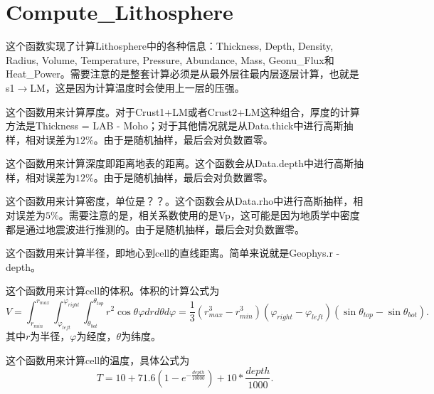 	\section{Compute\_Lithosphere}
		这个函数实现了计算Lithosphere中的各种信息：Thickness, Depth, Density, Radius, Volume, Temperature, Pressure, Abundance, Mass, Geonu\_Flux和Heat\_Power。需要注意的是整套计算必须是从最外层往最内层逐层计算，也就是s1$\rightarrow$LM，这是因为计算温度时会使用上一层的压强。
		\begin{GCBox}[title = Compute\_Layer\_Thickness]{}
			这个函数用来计算厚度。对于Crust1+LM或者Crust2+LM这种组合，厚度的计算方法是Thickness = LAB - Moho；对于其他情况就是从Data.thick中进行高斯抽样，相对误差为$12\%$。由于是随机抽样，最后会对负数置零。
		\end{GCBox}
		\begin{GCBox}[title = Compute\_Layer\_Depth]{}
			这个函数用来计算深度即距离地表的距离。这个函数会从Data.depth中进行高斯抽样，相对误差为$12\%$。由于是随机抽样，最后会对负数置零。
		\end{GCBox}
		\begin{GCBox}[title = Compute\_Layer\_Density]{}
			这个函数用来计算密度，单位是？？。这个函数会从Data.rho中进行高斯抽样，相对误差为$5\%$。需要注意的是，相关系数使用的是Vp，这可能是因为地质学中密度都是通过地震波进行推测的。由于是随机抽样，最后会对负数置零。
		\end{GCBox}
		\begin{GCBox}[title = Compute\_Layer\_Radius]{}
			这个函数用来计算半径，即地心到cell的直线距离。简单来说就是Geophys.r - depth。
		\end{GCBox}
		\begin{GCBox}[title = Compute\_Layer\_Volume]{}
			这个函数用来计算cell的体积。体积的计算公式为
				\begin{equation}
					V
					= \int_{r_{min}}^{r_{max}}\int_{\varphi_{left}}^{\varphi_{right}}\int_{\theta_{bot}}^{\theta_{top}}r^2\cos\theta\varphi drd\theta d\varphi
					= \frac{1}{3}(r_{max}^3 - r^3_{min})(\varphi_{right} - \varphi_{left})(\sin \theta_{top} - \sin\theta_{bot}).
				\end{equation}
			其中$r$为半径，$\varphi$为经度，$\theta$为纬度。
		\end{GCBox}
		\begin{GCBox}[title = Compute\_Layer\_Temperature]{}
			这个函数用来计算cell的温度，具体公式为
				\begin{equation}
					T
					= 10 + 71.6 (1 - e^{-\frac{depth}{10000}}) + 10 * \frac{depth}{1000}.
				\end{equation}
		\end{GCBox}
